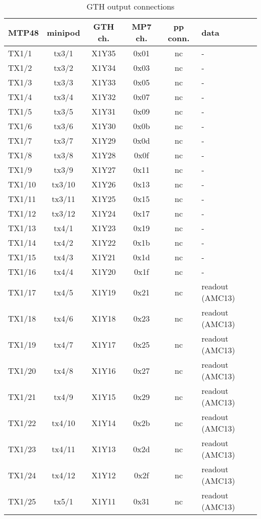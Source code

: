 \begin{longtable}{|l|c|c|c|c|l|}
\caption{GTH output connections}
    \label{tab:app:gth_o_conn}\\
\hline
\textbf{MTP48}& \textbf{minipod}& \textbf{GTH ch.}& \textbf{MP7 ch.} &\textbf{pp conn.}& \textbf{data}\\
\hline
\hline
\endhead
TX1/1  & tx3/1  & X1Y35 & 0x01 & nc & -\\\hline
TX1/2  & tx3/2  & X1Y34 & 0x03 & nc & -\\\hline
TX1/3  & tx3/3  & X1Y33 & 0x05 & nc & -\\\hline
TX1/4  & tx3/4  & X1Y32 & 0x07 & nc & -\\\hline
TX1/5  & tx3/5  & X1Y31 & 0x09 & nc & -\\\hline
TX1/6  & tx3/6  & X1Y30 & 0x0b & nc & -\\\hline
TX1/7  & tx3/7  & X1Y29 & 0x0d & nc & -\\\hline
TX1/8  & tx3/8  & X1Y28 & 0x0f & nc & -\\\hline
TX1/9  & tx3/9  & X1Y27 & 0x11 & nc & -\\\hline
TX1/10 & tx3/10 & X1Y26 & 0x13 & nc & -\\\hline
TX1/11 & tx3/11 & X1Y25 & 0x15 & nc & -\\\hline
TX1/12 & tx3/12 & X1Y24 & 0x17 & nc & -\\\hline
TX1/13 & tx4/1  & X1Y23 & 0x19 & nc & -\\\hline
TX1/14 & tx4/2  & X1Y22 & 0x1b & nc & -\\\hline
TX1/15 & tx4/3  & X1Y21 & 0x1d & nc & -\\\hline
TX1/16 & tx4/4  & X1Y20 & 0x1f & nc & -\\\hline
TX1/17 & tx4/5  & X1Y19 & 0x21 & nc & readout (AMC13)\\\hline
TX1/18 & tx4/6  & X1Y18 & 0x23 & nc & readout (AMC13)\\\hline
TX1/19 & tx4/7  & X1Y17 & 0x25 & nc & readout (AMC13)\\\hline
TX1/20 & tx4/8  & X1Y16 & 0x27 & nc & readout (AMC13)\\\hline
TX1/21 & tx4/9  & X1Y15 & 0x29 & nc & readout (AMC13)\\\hline
TX1/22 & tx4/10 & X1Y14 & 0x2b & nc & readout (AMC13)\\\hline
TX1/23 & tx4/11 & X1Y13 & 0x2d & nc & readout (AMC13)\\\hline
TX1/24 & tx4/12 & X1Y12 & 0x2f & nc & readout (AMC13)\\\hline
TX1/25 & tx5/1  & X1Y11 & 0x31 & nc & readout (AMC13)\\\hline

\end{longtable}
